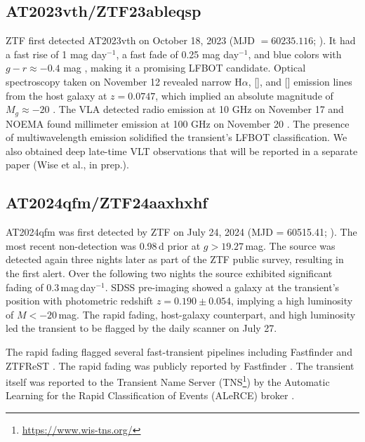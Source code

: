 \documentclass[twocolumn,twocolappendix, linenumbers, trackchanges]{aastex7}
\begin{document}
\subsection{AT2023vth/ZTF23ableqsp}
ZTF first detected AT2023vth on October 18, 2023 (MJD $=60235.116$; \citealt{astro2023vth_disc}).  It had a fast rise of 1 mag day$^{-1}$, a fast fade of 0.25 mag day$^{-1}$, and blue colors with $g-r \approx -0.4$ mag \citep{astro2023vth_ztf}, making it a promising LFBOT candidate.  Optical spectroscopy taken on November 12 revealed narrow H$\alpha$, [], and [] emission lines from the host galaxy at $z=0.0747$, which implied an absolute magnitude of $M_g\approx -20$ \citep{astro2023fhn_p200}.  The VLA detected radio emission at 10 GHz on November 17 \citep{astro2023vth_vla} and NOEMA found millimeter emission at 100 GHz on November 20 \citep{astro2023vth_noema}.  The presence of multiwavelength emission solidified the transient's LFBOT classification. We also obtained deep late-time VLT observations that will be reported in a separate paper  (Wise et al., in prep.). 

\subsection{AT2024qfm/ZTF24aaxhxhf}

AT2024qfm was first detected by ZTF on July 24, 2024 (MJD = 60515.41; \citealt{astro2024qfm_disc}). The most recent non-detection was 0.98\,d prior at $g>19.27\,$mag. The source was detected again three nights later as part of the ZTF public survey, resulting in the first alert. Over the following two nights the source exhibited significant fading of $0.3$\,mag\,day$^{-1}$. SDSS pre-imaging showed a galaxy at the transient's position with photometric redshift $z=0.190\pm0.054$, implying a high luminosity of $M<-20\,$mag. The rapid fading, host-galaxy counterpart, and high luminosity led the transient to be flagged by the daily scanner on July 27. 

The rapid fading flagged several fast-transient pipelines including Fastfinder \citep{Fulton2024_AT2024qfm} and ZTFReST \citep{Andreoni2021}. The rapid fading was publicly reported by Fastfinder \citep{Fulton2024_AT2024qfm}. The transient itself was reported to the Transient Name Server (TNS\footnote{\url{https://www.wis-tns.org/}}) by the Automatic Learning for the Rapid Classification of Events (ALeRCE) broker \citep{astro2024qfm_disc}.
\end{document}
